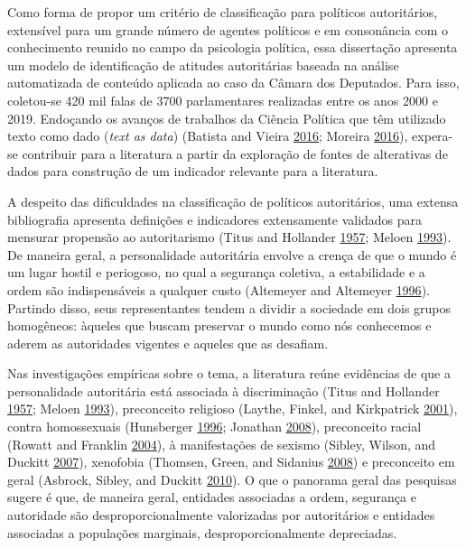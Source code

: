 \documentclass[12 pt,]{article}
\begin{document}
Como forma de propor um critério de classificação para políticos
autoritários, extensível para um grande número de agentes políticos e em
consonância com o conhecimento reunido no campo da psicologia política,
essa dissertação apresenta um modelo de identificação de atitudes
autoritárias baseada na análise automatizada de conteúdo aplicada ao
caso da Câmara dos Deputados. Para isso, coletou-se 420 mil falas de
3700 parlamentares realizadas entre os anos 2000 e 2019. Endoçando os
avanços de trabalhos da Ciência Política que têm utilizado texto como
dado (\emph{text as data}) (Batista and Vieira
\protect\hyperlink{ref-batista2016mensurando}{2016}; Moreira
\protect\hyperlink{ref-moreira2016palavra}{2016}), expera-se contribuir
para a literatura a partir da exploração de fontes de alterativas de
dados para construção de um indicador relevante para a literatura.

A despeito das dificuldades na classificação de políticos autoritários,
uma extensa bibliografia apresenta definições e indicadores extensamente
validados para mensurar propensão ao autoritarismo (Titus and Hollander
\protect\hyperlink{ref-titus1957california}{1957}; Meloen
\protect\hyperlink{ref-meloen1993f}{1993}). De maneira geral, a
personalidade autoritária envolve a crença de que o mundo é um lugar
hostil e periogoso, no qual a segurança coletiva, a estabilidade e a
ordem são indispensáveis a qualquer custo (Altemeyer and Altemeyer
\protect\hyperlink{ref-altemeyer1996authoritarian}{1996}). Partindo
disso, seus representantes tendem a dividir a sociedade em dois grupos
homogêneos: àqueles que buscam preservar o mundo como nós conhecemos e
aderem as autoridades vigentes e aqueles que as desafiam.

Nas investigações empíricas sobre o tema, a literatura reúne evidências
de que a personalidade autoritária está associada à discriminação (Titus
and Hollander \protect\hyperlink{ref-titus1957california}{1957}; Meloen
\protect\hyperlink{ref-meloen1993f}{1993}), preconceito religioso
(Laythe, Finkel, and Kirkpatrick
\protect\hyperlink{ref-laythe2001predicting}{2001}), contra homossexuais
(Hunsberger \protect\hyperlink{ref-hunsberger1996religious}{1996};
Jonathan \protect\hyperlink{ref-jonathan2008influence}{2008}),
preconceito racial (Rowatt and Franklin
\protect\hyperlink{ref-rowatt2004christian}{2004}), à manifestações de
sexismo (Sibley, Wilson, and Duckitt
\protect\hyperlink{ref-sibley2007antecedents}{2007}), xenofobia
(Thomsen, Green, and Sidanius
\protect\hyperlink{ref-thomsen2008we}{2008}) e preconceito em geral
(Asbrock, Sibley, and Duckitt
\protect\hyperlink{ref-asbrock2010right}{2010}). O que o panorama geral
das pesquisas sugere é que, de maneira geral, entidades associadas a
ordem, segurança e autoridade são desproporcionalmente valorizadas por
autoritários e entidades associadas a populações marginais,
desproporcionalmente depreciadas.
\end{document}
